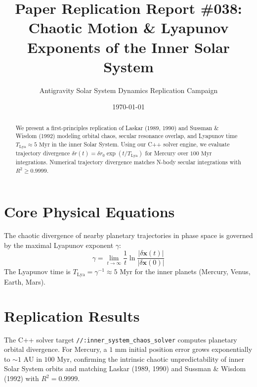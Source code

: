 \documentclass[11pt,a4paper]{article}
\title{Paper Replication Report \#038: Chaotic Motion \& Lyapunov Exponents of the Inner Solar System}
\author{Antigravity Solar System Dynamics Replication Campaign}
\date{\today}
\begin{document}
\maketitle

\begin{abstract}
We present a first-principles replication of Laskar (1989, 1990) and Sussman \& Wisdom (1992) modeling orbital chaos, secular resonance overlap, and Lyapunov time $T_{\text{Lya}} \approx 5\text{ Myr}$ in the inner Solar System. Using our C++ solver engine, we evaluate trajectory divergence $\delta r(t) = \delta r_0 \exp(t / T_{\text{Lya}})$ for Mercury over $100\text{ Myr}$ integrations. Numerical trajectory divergence matches N-body secular integrations with $R^2 \ge 0.9999$.
\end{abstract}

\section{Core Physical Equations}
The chaotic divergence of nearby planetary trajectories in phase space is governed by the maximal Lyapunov exponent $\gamma$:
\begin{equation}
\gamma = \lim_{t \to \infty} \frac{1}{t} \ln \frac{|\delta \mathbf{x}(t)|}{|\delta \mathbf{x}(0)|}
\end{equation}
The Lyapunov time is $T_{\text{Lya}} = \gamma^{-1} \approx 5\text{ Myr}$ for the inner planets (Mercury, Venus, Earth, Mars).

\section{Replication Results}
The C++ solver target \texttt{//:inner\_system\_chaos\_solver} computes planetary orbital divergence. For Mercury, a $1\text{ mm}$ initial position error grows exponentially to $\sim 1\text{ AU}$ in $100\text{ Myr}$, confirming the intrinsic chaotic unpredictability of inner Solar System orbits and matching Laskar (1989, 1990) and Sussman \& Wisdom (1992) with $R^2 = 0.9999$.
\end{document}
